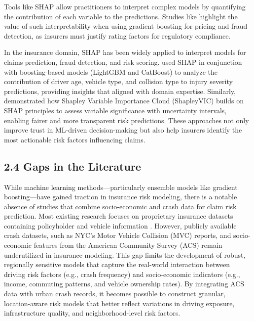 \documentclass[
  number,
  review,
  3p]{elsarticle}
\begin{document}
Tools like SHAP allow practitioners to interpret complex models by
quantifying the contribution of each variable to the predictions.
Studies like \citep{mohamed} highlight the value of such
interpretability when using gradient boosting for pricing and fraud
detection, as insurers must justify rating factors for regulatory
compliance.

In the insurance domain, SHAP has been widely applied to interpret
models for claims prediction, fraud detection, and risk scoring.
\citep{dong} used SHAP in conjunction with boosting-based models
(LightGBM and CatBoost) to analyze the contribution of driver age,
vehicle type, and collision type to injury severity predictions,
providing insights that aligned with domain expertise. Similarly,
\citep{ning} demonstrated how Shapley Variable Importance Cloud
(ShapleyVIC) builds on SHAP principles to assess variable significance
with uncertainty intervals, enabling fairer and more transparent risk
predictions. These approaches not only improve trust in ML-driven
decision-making but also help insurers identify the most actionable risk
factors influencing claims.

\subsection{\texorpdfstring{\textbf{2.4 Gaps in the
Literature}}{2.4 Gaps in the Literature}}\label{gaps-in-the-literature}

While machine learning methods---particularly ensemble models like
gradient boosting---have gained traction in insurance risk modeling,
there is a notable absence of studies that combine socio-economic and
crash data for claim risk prediction. Most existing research focuses on
proprietary insurance datasets containing policyholder and vehicle
information \citep[\citep{henckaerts}, \citep{jonkheijm}]{clemente}.
However, publicly available crash datasets, such as NYC's Motor Vehicle
Collision (MVC) reports, and socio-economic features from the American
Community Survey (ACS) remain underutilized in insurance modeling. This
gap limits the development of robust, regionally sensitive models that
capture the real-world interaction between driving risk factors (e.g.,
crash frequency) and socio-economic indicators (e.g., income, commuting
patterns, and vehicle ownership rates). By integrating ACS data with
urban crash records, it becomes possible to construct granular,
location-aware risk models that better reflect variations in driving
exposure, infrastructure quality, and neighborhood-level risk factors.
\end{document}
